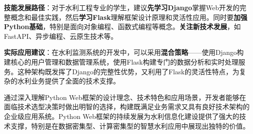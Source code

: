\textbf{技能发展路径}：对于水利工程专业的学生，建议\textbf{先学习Django}掌握Web开发的完整概念和最佳实践，然后\textbf{学习Flask}理解框架设计原理和灵活性应用。同时要\textbf{加强Python基础}，特别是面向对象编程、函数式编程等概念。\textbf{关注新技术发展}，如FastAPI、异步编程、云原生技术等。

\textbf{实际应用建议}：在水利监测系统的开发中，可以采用\textbf{混合策略}------使用Django构建核心的用户管理和数据管理系统，使用Flask构建专门的数据分析和实时处理服务。这种架构既发挥了Django的完整性优势，又利用了Flask的灵活性特点，为复杂的水利业务提供了全面的技术支撑。

通过深入理解Python Web框架的设计理念、技术特色和应用场景，开发者能够在面临技术选型决策时做出明智的选择，构建既满足业务需求又具有良好技术架构的企业级应用系统。Python Web框架的持续发展为水利信息化建设提供了强大的技术支撑，特别是在数据密集型、计算密集型的智慧水利应用中展现出独特的价值。
